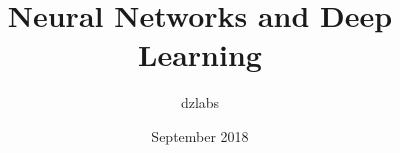 \documentclass{article}
\title{Neural Networks and Deep Learning}
\author{dzlabs }
\date{September 2018}
\begin{document}
\maketitle
\pagestyle{empty}

\def\layersep{2.5cm}





\end{document}
